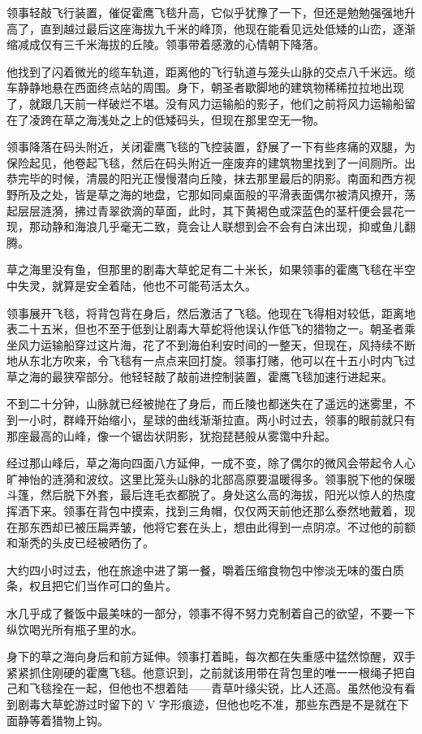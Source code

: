 \documentclass[AutoFakeBold=true]{book}
\begin{document}
领事轻敲飞行装置，催促霍鹰飞毯升高，它似乎犹豫了一下，但还是勉勉强强地升高了，直到越过最后这座海拔九千米的峰顶，他现在能看见远处低矮的山峦，逐渐缩减成仅有三千米海拔的丘陵。领事带着感激的心情朝下降落。

他找到了闪着微光的缆车轨道，距离他的飞行轨道与笼头山脉的交点八千米远。缆车静静地悬在西面终点站的周围。身下，朝圣者歇脚地的建筑物稀稀拉拉地出现了，就跟几天前一样破烂不堪。没有风力运输船的影子，他们之前将风力运输船留在了凌跨在草之海浅处之上的低矮码头，但现在那里空无一物。

领事降落在码头附近，关闭霍鹰飞毯的飞控装置，舒展了一下有些疼痛的双腿，为保险起见，他卷起飞毯，然后在码头附近一座废弃的建筑物里找到了一间厕所。出恭完毕的时候，清晨的阳光正慢慢潜向丘陵，抹去那里最后的阴影。南面和西方视野所及之处，皆是草之海的地盘，它那如同桌面般的平滑表面偶尔被清风撩开，荡起层层涟漪，拂过青翠欲滴的草面，此时，其下黄褐色或深蓝色的茎杆便会昙花一现，那动静和海浪几乎毫无二致，竟会让人联想到会不会有白沫出现，抑或鱼儿翻腾。

草之海里没有鱼，但那里的剧毒大草蛇足有二十米长，如果领事的霍鹰飞毯在半空中失灵，就算是安全着陆，他也不可能苟活太久。

领事展开飞毯，将背包背在身后，然后激活了飞毯。他现在飞得相对较低，距离地表二十五米，但也不至于低到让剧毒大草蛇将他误认作低飞的猎物之一。朝圣者乘坐风力运输船穿过这片海，花了不到海伯利安时间的一整天，但现在，风持续不断地从东北方吹来，令飞毯有一点点来回打旋。领事打赌，他可以在十五小时内飞过草之海的最狭窄部分。他轻轻敲了敲前进控制装置，霍鹰飞毯加速行进起来。

不到二十分钟，山脉就已经被抛在了身后，而丘陵也都迷失在了遥远的迷雾里，不到一小时，群峰开始缩小，星球的曲线渐渐拉直。两小时过去，领事的眼前就只有那座最高的山峰，像一个锯齿状阴影，犹抱琵琶般从雾霭中升起。

经过那山峰后，草之海向四面八方延伸，一成不变，除了偶尔的微风会带起令人心旷神怡的涟漪和波纹。这里比笼头山脉的北部高原要温暖得多。领事脱下他的保暖斗篷，然后脱下外套，最后连毛衣都脱了。身处这么高的海拔，阳光以惊人的热度挥洒下来。领事在背包中摸索，找到三角帽，仅仅两天前他还那么泰然地戴着，现在那东西却已被压扁弄皱，他将它套在头上，想由此得到一点阴凉。不过他的前额和渐秃的头皮已经被晒伤了。

大约四小时过去，他在旅途中进了第一餐，嚼着压缩食物包中惨淡无味的蛋白质条，权且把它们当作可口的鱼片。

水几乎成了餐饭中最美味的一部分，领事不得不努力克制着自己的欲望，不要一下纵饮喝光所有瓶子里的水。

身下的草之海向身后和前方延伸。领事打着盹，每次都在失重感中猛然惊醒，双手紧紧抓住刚硬的霍鹰飞毯。他意识到，之前就该用带在背包里的唯一一根绳子把自己和飞毯拴在一起，但他也不想着陆——青草叶缘尖锐，比人还高。虽然他没有看到剧毒大草蛇游过时留下的 V 字形痕迹，但他也吃不准，那些东西是不是就在下面静等着猎物上钩。
\end{document}
